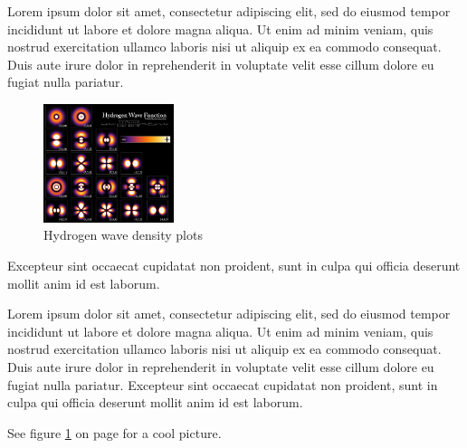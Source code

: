 \documentclass[]{article}
\begin{document}
Lorem ipsum dolor sit amet, consectetur adipiscing elit, sed do eiusmod tempor incididunt ut labore et dolore magna aliqua. Ut enim ad minim veniam, quis nostrud exercitation ullamco laboris nisi ut aliquip ex ea commodo consequat. Duis aute irure dolor in reprehenderit in voluptate velit esse cillum dolore eu fugiat nulla pariatur. 
\begin{figure}[h]  %

\centering

\includegraphics[width=1.5in]{Hydrogen_Density_Plots}

\caption{Hydrogen wave density plots}  %

\label{fig:hwaves}

\end{figure}
Excepteur sint occaecat cupidatat non proident, sunt in culpa qui officia deserunt mollit anim id est laborum.

Lorem ipsum dolor sit amet, consectetur adipiscing elit, sed do eiusmod tempor incididunt ut labore et dolore magna aliqua. Ut enim ad minim veniam, quis nostrud exercitation ullamco laboris nisi ut aliquip ex ea commodo consequat. Duis aute irure dolor in reprehenderit in voluptate velit esse cillum dolore eu fugiat nulla pariatur. Excepteur sint occaecat cupidatat non proident, sunt in culpa qui officia deserunt mollit anim id est laborum.

See figure \ref{fig:hwaves} on page \pageref{fig:hwaves} for a cool picture.
\end{document}
